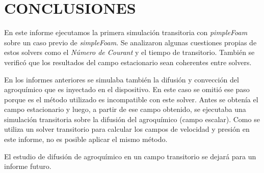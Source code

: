 \documentclass[oneside,a4paper,spanish,links]{amca}
\begin{document}
\section{CONCLUSIONES}
En este informe ejecutamos la primera simulación transitoria con \textit{pimpleFoam} sobre un caso previo de \textit{simpleFoam}. Se analizaron algunas cuestiones propias de estos solvers como el \textit{Número de Courant} y el  tiempo de transitorio. También se verificó que los resultados del campo estacionario sean coherentes entre solvers.

En los informes anteriores se simulaba también la difusión y convección del agroquímico que es inyectado en el dispositivo. En este caso se omitió ese paso porque es el método utilizado es incompatible con este solver. Antes se obtenía el campo estacionario y luego, a partir de ese campo obtenido, se ejecutaba una simulación transitoria sobre la difusión del agroquímico (campo escalar). Como se utiliza un solver transitorio para calcular los campos de velocidad y presión en este informe, no es posible aplicar el mismo método.

El estudio de difusión de agroquímico en un campo transitorio se dejará para un informe futuro.

%
%
\end{document}
